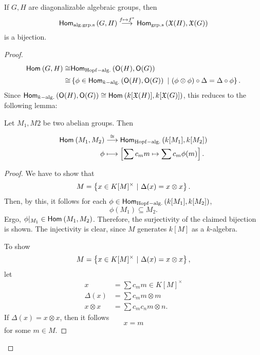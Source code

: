 \begin{lemma}
If $G,H$ are diagonalizable algebraic groups, then
\[ \textsf{Hom}_{\mathrm{alg.grp.s}}\left(G, H\right) \overset{f \mapsto f^*}{\longrightarrow} \textsf{Hom}_{\mathrm{grp.}s}\left(\mathfrak{X}(H), \mathfrak{X}(G)\right) \]
is a bijection.
\end{lemma}
\begin{proof}
\begin{align*}
\textsf{Hom}_{}\left(G, H\right) \overset{}{\cong} &\textsf{Hom}_{\mathrm{Hopf-alg.}}\left(\mathsf{O}(H), \mathsf{O}(G)\right)\\
 \overset{}{\cong} &\left\lbrace\phi \in \textsf{Hom}_{k\mathrm{-alg.}}\left(\mathsf{O}(H), \mathsf{O}(G)\right) ~ | ~ (\phi \otimes \phi) \circ \Delta = \Delta \circ \phi\right\rbrace.
\end{align*}
Since $\textsf{Hom}_{k\mathrm{-alg.}}\left(\mathsf{O}(H), \mathsf{O}(G)\right) \overset{}{\cong} \textsf{Hom}_{}\left(k[\mathfrak{X}(H)], k[\mathfrak{X}(G)]\right)$, this reduces to the following lemma:
\begin{lemma}
Let $M_1, M2$ be two abelian groups. Then
\begin{align*}
\textsf{Hom}_{}\left(M_1, M_2\right) & \overset{\overset{}{\cong}}{\longrightarrow} \textsf{Hom}_{\mathrm{Hopf-alg.}}\left(k[M_1], k[M_2]\right)\\
\phi & \longmapsto \left[ \sum c_m m \mapsto \sum c_m \phi(m) \right] .
\end{align*}
\end{lemma}
\begin{proof}
We have to show that
\[ M = \left\lbrace x \in K[M]^\times ~ | ~ \Delta(x) = x \otimes x\right\rbrace. \]
Then, by this, it follows for each $\phi \in \textsf{Hom}_{\mathrm{Hopf-alg.}}\left(k[M_1], k[M_2]\right)$,
\[ \phi(M_1) \subseteq M_2. \]
Ergo, $\phi|_{M_1} \in \textsf{Hom}_{}\left(M_1, M_2\right)$. Therefore, the surjectivity of the claimed bijection is shown.
The injectivity is clear, since $M$ generates $k[M]$ as a $k$-algebra.

To show
\[ M = \left\lbrace x \in K[M]^\times ~ | ~ \Delta(x) = x \otimes x\right\rbrace, \]
let
\begin{align*}
x &= \sum c_m m\in K[M]^\times\\
\Delta(x) &= \sum c_m m \otimes m\\
x \otimes x &= \sum c_m c_n m\otimes n.
\end{align*}
If $\Delta(x) = x \otimes x$, then it follows
\[ x = m \]
for some $m \in M$.

\end{proof}
\end{proof}
